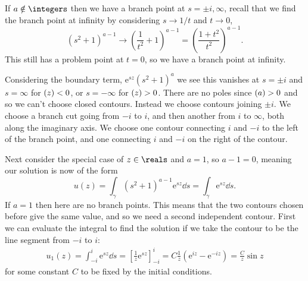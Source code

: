 \documentclass[fleqn]{NotesClass}
\newcommand*{\e}{\mathrm{e}}
\let\Re\relax
\DeclareMathOperator{\Re}{Re}
\begin{document}
    If \(a \notin \integers\) then we have a branch point at \(s = \pm i, \infty\), recall that we find the branch point at infinity by considering \(s \to 1/t\) and \(t \to 0\),
    \begin{equation}
        (s^2 + 1)^{a - 1} \to \left( \frac{1}{t^2} + 1 \right)^{a-1} = \left( \frac{1 + t^2}{t^2} \right)^{a - 1}.
    \end{equation}
    This still has a problem point at \(t = 0\), so we have a branch point at infinity.
    
    Considering the boundary term, \(\e^{sz}(s^2 + 1)^a\) we see this vanishes at \(s = \pm i\) and \(s = \infty\) for \(\Re(z) < 0\), or \(s = -\infty\) for \(\Re(z) > 0\).
    There are no poles since \(\Re(a) > 0\) and so we can't choose closed contours.
    Instead we choose contours joining \(\pm i\).
    We choose a branch cut going from \(-i\) to \(i\), and then another from \(i\) to \(\infty\), both along the imaginary axis.
    We choose one contour connecting \(i\) and \(-i\) to the left of the branch point, and one connecting \(i\) and \(-i\) on the right of the contour.
    
    Next consider the special case of \(z \in \reals\) and \(a = 1\), so \(a - 1 = 0\), meaning our solution is now of the form
    \begin{equation}
        u(z) = \int_{\gamma} (s^2 + 1)^{a - 1} \e^{sz} \dd{s} = \int_{\gamma} \e^{sz} \dd{s}.
    \end{equation}
    If \(a = 1\) then here are no branch points.
    This means that the two contours chosen before give the same value, and so we need a second independent contour.
    First we can evaluate the integral to find the solution if we take the contour to be the line segment from \(-i\) to \(i\):
    \begin{align}
        u_1(z) = \int_{-i}^{i} \e^{sz} \dd{s} = \left[ \frac{1}{z}\e^{sz} \right]_{-i}^{i} = C\frac{1}{z}(\e^{iz} - \e^{-iz}) = \frac{C}{z}\sin z
    \end{align}
    for some constant \(C\) to be fixed by the initial conditions.
    
\end{document}

